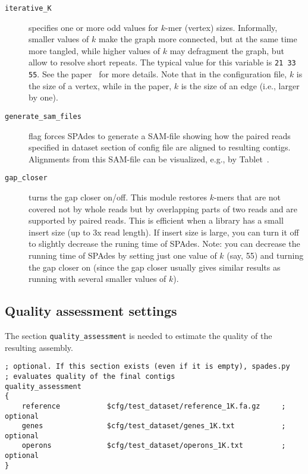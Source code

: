 \documentclass{article}
\def\spades{SPAdes}
\begin{document}
\begin{description}
\item[{\tt iterative\_K}] specifies one or more odd values for $k$-mer (vertex) sizes.  Informally, smaller values of $k$ make the graph more connected,
but at the same time more tangled, while higher values of $k$ may defragment the graph, but allow to resolve short repeats.
The typical value for this variable is {\tt 21 33 55}. See the paper~\cite{main} for more details.
Note that in the configuration file, $k$ is the size of a vertex, while in the paper, $k$ is the size of an edge (i.e., larger by one).

\item[{\tt generate\_sam\_files}] flag forces {\spades} to generate a SAM-file
showing how the paired reads specified in dataset section of config file are aligned to resulting contigs.  Alignments from this SAM-file
can be visualized, e.g., by Tablet~\cite{tablet}.

\item[{\tt gap\_closer}] turns the gap closer on/off. This module restores $k$-mers that are not covered not by whole reads
but by overlapping parts of two reads and are supported by paired reads. This is efficient when a library has a small insert size (up to 3x read length). If insert size is large, you can turn 
it off to slightly decrease the runing time of {\spades}.
Note: you can decrease the running time of {\spades} by setting just one value of $k$ (say, 55) and turning the gap closer on
(since the gap closer usually gives similar results as running with several smaller values of $k$).
\end{description}

\subsection{Quality assessment settings}\label{subsection:qualitysetting}
The section {\tt quality\_assessment}
is needed to estimate the quality of the resulting assembly.

\begin{lstlisting}
; optional. If this section exists (even if it is empty), spades.py 
; evaluates quality of the final contigs
quality_assessment      
{
    reference           $cfg/test_dataset/reference_1K.fa.gz     ; optional
    genes               $cfg/test_dataset/genes_1K.txt           ; optional
    operons             $cfg/test_dataset/operons_1K.txt         ; optional
}
\end{lstlisting}
\end{document}
